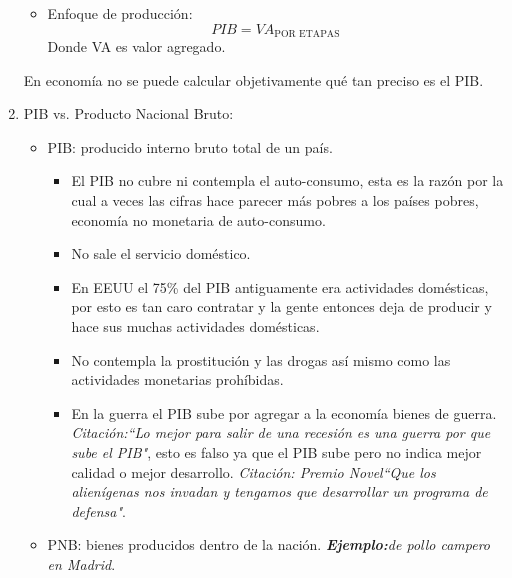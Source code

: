 \begin{enumerate}
\begin{itemize}
        \item Enfoque de producción:
        \[
          PIB = VA_{\text{POR ETAPAS}}
        \]
        Donde VA es valor agregado.
    \end{itemize}
    En economía no se puede calcular objetivamente qué tan preciso es el PIB.
    
    \item PIB vs. Producto Nacional Bruto: 
    \begin{itemize}
        \item PIB: producido interno bruto total de un país.
        \begin{itemize}
            \item El PIB no cubre ni contempla el auto-consumo, esta es la razón por la cual a veces las cifras hace parecer más pobres a los países pobres, economía no monetaria de auto-consumo.
            \item No sale el servicio doméstico.
            \item En EEUU el 75\% del PIB antiguamente era actividades domésticas, por esto es tan caro contratar y la gente entonces deja de producir y hace sus muchas actividades domésticas.
            \item No contempla la prostitución y las drogas así mismo como las actividades monetarias prohíbidas.
            \item En la guerra el PIB sube por agregar a la economía bienes de guerra. \emph{Citación:``Lo mejor para salir de una recesión es una guerra por que sube el PIB"}, esto es falso ya que el PIB sube pero no indica mejor calidad o mejor desarrollo. \emph{Citación: Premio Novel``Que los alienígenas nos invadan y tengamos que desarrollar un programa de defensa"}.
        \end{itemize}
        \item PNB: bienes producidos dentro de la nación. \emph{\textbf{Ejemplo:}de pollo campero en Madrid}.
    \end{itemize}
\end{enumerate}
